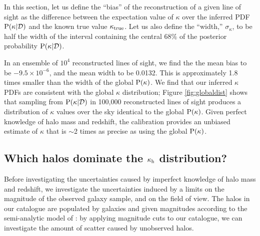 \documentclass[useAMS,usenatbib]{mn2e}
\begin{document}
%
%
%


In this section, let us define the ``bias'' of the reconstruction of a given
line of sight as the difference between the expectation value of $\kappa$ over
the inferred PDF ${\rm P}(\kappa|{\mathcal{D}})$ and the known true value $\kappa_{\rm true}$.
Let us also define the ``width,'' $\sigma_{\kappa}$, to be half the width of
the interval containing the central $68\%$ of the posterior probability
${\rm P}(\kappa|{\mathcal{D}})$. 

In an ensemble of $10^{4}$ reconstructed lines of sight, we find the the mean
bias to be $-9.5\times 10^{-6}$, and the mean width to be 0.0132. This is
approximately 1.8 times smaller than the width of the global ${\rm P}(\kappa)$. 
We find that our inferred $\kappa$ PDFs are consistent with the global
$\kappa$ distribution; Figure \ref{fig:globaldist} shows that sampling from
${\rm P}(\kappa|{\mathcal{D}})$ in 100,000 reconstructed lines of sight produces a
distribution of $\kappa$ values over the sky identical to the global
${\rm P}(\kappa)$. Given perfect knowledge of halo mass and redshift, the
calibration \proceedure provides an unbiased estimate of $\kappa$ that is
$\sim$2 times as precise as using the global ${\rm P}(\kappa)$.


\subsection{Which halos dominate the $\kappa_{\rm h}$ distribution?}

Before investigating the uncertainties caused by imperfect knowledge of halo
mass and redshift, we investigate the uncertainties induced by a limits on the
magnitude of the observed galaxy sample, and on the field of view. The halos
in our catalogue are populated by galaxies and given magnitudes according to
the semi-analytic model of \citet{DeLucia+Blaizot2007}: by applying magnitude
cuts to our catalogue, we can investigate the amount of scatter caused by
unobserved halos. 
\end{document}
